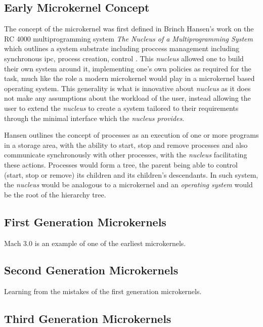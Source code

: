 \documentclass[literature_review.tex]{subfiles}
\begin{document}
\subsection{Early Microkernel Concept} 
The concept of the microkernel was first defined in Brinch Hansen's work on the RC 4000 multiprogramming system \textit{The Nucleus of a Multiprogramming System} which outlines a system substrate including proccess management including synchronous \gls{ipc}, process creation, control \citep{Brinch_Hansen_70}. This \textit{nucleus} allowed one to build their own system around it, implementing one's own policies as required for the task, much like the role a modern microkernel would play in a microkernel based operating system. This generality is what is innovative about \textit{nucleus} as it does not make any assumptions about the workload of the user, instead allowing the user to extend the \textit{nucleus} to create a system tailored to their requirements through the minimal interface which the \textit{nucleus provides}.

Hansen outlines the concept of processes as an execution of one or more programs in a storage area, with the ability to start, stop and remove processes and also communicate synchronously with other processes, with the \textit{nucleus} facilitating these actions. Processes would form a tree, the parent being able to control (start, stop or remove) its children and its children's descendants. In such system, the \textit{nucleus} would be analogous to a microkernel and an \textit{operating system} would be the root of the hierarchy tree.

\subsection{First Generation Microkernels}
Mach 3.0 is an example of one of the earliest microkernels.

\subsection{Second Generation Microkernels}
Learning from the mistakes of the first generation microkernels.
\subsection{Third Generation Microkernels}
\end{document}
